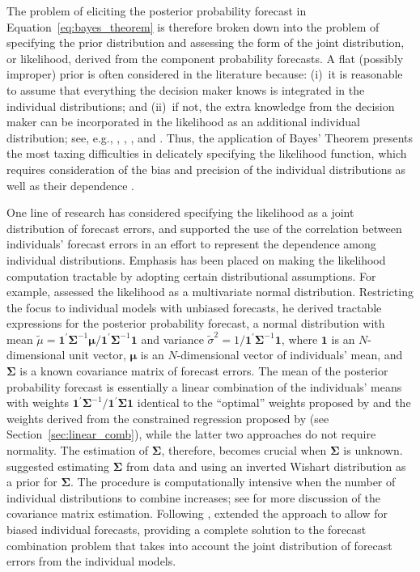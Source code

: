 \documentclass[a4paper,11pt]{article}
\begin{document}
The problem of eliciting the posterior probability forecast in Equation~\eqref{eq:bayes_theorem} is therefore broken down into the problem of specifying the prior distribution and assessing the form of the joint distribution, or likelihood, derived from the component probability forecasts. A flat (possibly improper) prior is often considered in the literature because: (i)~it is reasonable to assume that everything the decision maker knows is integrated in the individual distributions; and (ii)~if not, the extra knowledge from the decision maker can be incorporated in the likelihood as an additional individual distribution; see, e.g., \citet{Winkler1968-uw}, \citet{Clemen1993-ty}, \citet{Clemen1985-kx}, and \citet{Jouini1996-fe}. Thus, the application of Bayes' Theorem presents the most taxing difficulties in delicately specifying the likelihood function, which requires consideration of the bias and precision of the individual distributions as well as their dependence \citep{Hall2007-lh}.

One line of research has considered specifying the likelihood as a joint distribution of forecast errors, and supported the use of the correlation between individuals' forecast errors in an effort to represent the dependence among individual distributions. Emphasis has been placed on making the likelihood computation tractable by adopting certain distributional assumptions. For example, \citet{Winkler1981-bn} assessed the likelihood as a multivariate normal distribution. Restricting the focus to individual models with unbiased forecasts, he derived tractable expressions for the posterior probability forecast, a normal distribution with mean $\tilde{\mu} = \bm{1}^{\prime} \bm{\Sigma}^{-1} \bm{\mu} / \bm{1}^{\prime} \bm{\Sigma}^{-1} \bm{1}$ and variance $\tilde{\sigma}^{2} = 1/\bm{1}^{\prime} \bm{\Sigma}^{-1} \bm{1}$, where $\bm{1}$ is an $N$-dimensional unit vector, $\bm{\mu}$ is an $N$-dimensional vector of individuals' mean, and $\bm{\Sigma}$ is a known covariance matrix of forecast errors. The mean of the posterior probability forecast is essentially a linear combination of the individuals' means with weights $\bm{1}^{\prime} \bm{\Sigma}^{-1} / \bm{1}^{\prime} \bm{\Sigma} \bm{1}$ identical to the ``optimal'' weights proposed by \citet{Bates1969-yj} and the weights derived from the constrained regression proposed by \citet{Granger1984-jc} (see Section~\ref{sec:linear_comb}), while the latter two approaches do not require normality. The estimation of $\bm{\Sigma}$, therefore, becomes crucial when $\bm{\Sigma}$ is unknown. \citet{Winkler1981-bn} suggested estimating $\bm{\Sigma}$ from data and using an inverted Wishart distribution as a prior for $\bm{\Sigma}$. The procedure is computationally intensive when the number of individual distributions to combine increases; see \citet{Hall2007-lh} for more discussion of the covariance matrix estimation. Following \citet{Winkler1981-bn}, \citet{Palm1992-im} extended the approach to allow for biased individual forecasts, providing a complete solution to the forecast combination problem that takes into account the joint distribution of forecast errors from the individual models.
\end{document}
